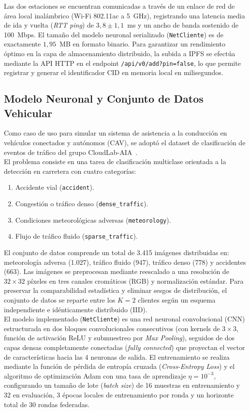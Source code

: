 Las dos estaciones se encuentran comunicadas a través de un enlace de red de área local inalámbrico (Wi-Fi 802.11ac a 5~GHz), registrando una latencia media de ida y vuelta (\textit{RTT ping}) de $3{,}8 \pm 1{,}1$~ms y un ancho de banda sostenido de 100~Mbps. El tamaño del modelo neuronal serializado (\texttt{NetCliente}) es de exactamente $1{,}95$~MB en formato binario. Para garantizar un rendimiento óptimo en la capa de almacenamiento distribuido, la subida a IPFS se efectúa mediante la API HTTP en el endpoint \texttt{/api/v0/add?pin=false}, lo que permite registrar y generar el identificador CID en memoria local en milisegundos.

\subsection{Modelo Neuronal y Conjunto de Datos Vehicular}
Como caso de uso para simular un sistema de asistencia a la conducción en vehículos conectados y autónomos (CAV), se adoptó el dataset de clasificación de eventos de tráfico del grupo CloudLab-AIA~\cite{cloudlabaia_flblockchain}. 
\\

El problema consiste en una tarea de clasificación multiclase orientada a la detección en carretera con cuatro categorías:
\begin{enumerate}
    \item Accidente vial (\texttt{accident}).
    \item Congestión o tráfico denso (\texttt{dense\_traffic}).
    \item Condiciones meteorológicas adversas (\texttt{meteorology}).
    \item Flujo de tráfico fluido (\texttt{sparse\_traffic}).
\end{enumerate}

El conjunto de datos comprende un total de 3.415 imágenes distribuidas en: meteorología adversa (1.027), tráfico fluido (947), tráfico denso (778) y accidentes (663). Las imágenes se preprocesan mediante reescalado a una resolución de $32 \times 32$ píxeles en tres canales cromáticos (RGB) y normalización estándar. Para preservar la comparabilidad estadística y eliminar sesgos de distribución, el conjunto de datos se reparte entre los $K=2$ clientes según un esquema independiente e idénticamente distribuido (IID).
\\

El modelo implementado (\texttt{NetCliente}) es una red neuronal convolucional (CNN) estructurada en dos bloques convolucionales consecutivos (con kernels de $3 \times 3$, función de activación ReLU y submuestreo por \textit{Max Pooling}), seguidos de dos capas densas completamente conectadas (\textit{fully connected}) que proyectan el vector de características hacia las 4 neuronas de salida. El entrenamiento se realiza mediante la función de pérdida de entropía cruzada (\textit{Cross-Entropy Loss}) y el algoritmo de optimización Adam con una tasa de aprendizaje $\eta = 10^{-3}$, configurando un tamaño de lote (\textit{batch size}) de 16 muestras en entrenamiento y 32 en evaluación, 3 épocas locales de entrenamiento por ronda y un horizonte total de 30 rondas federadas.
\\

